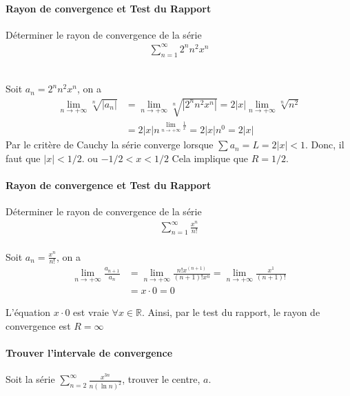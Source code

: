 \documentclass{report}
\begin{document}
\begin{multicols*}{2}
  \paragraph{Rayon de convergence et Test du Rapport}
      Déterminer le rayon de convergence de la série
      \begin{align*}
          \sum_{n=1}^{\infty }2^nn^2x^n
      \end{align*}
  
  \mbox{}\\ 
  Soit $a_n = 2^nn^2x^n$, on a 
  \begin{align*}
      \lim\limits_{n \to+\infty }\sqrt[n]{|a_n|}  &= 
      \lim\limits_{n \to+\infty }\sqrt[n]{|2^nn^2x^n|}  = 2|x|
      \lim\limits_{n \to+\infty }\sqrt[n]{n^2}  \\ 
                                      &= 
      2|x|n^{\lim\limits_{n \to+\infty } \frac{1}{x}} = 2|x|n^0 = 2|x|
  \end{align*}
  Par le critère de Cauchy la série converge lorsque 
  $\sum a_n = L = 2|x| < 1$. Donc, il faut que $|x| < 1/2$. 
  ou $ -1/2 < x < 1/2 $  
  Cela implique que $R = 1/2$. 


  \paragraph{Rayon de convergence et Test du Rapport}
      Déterminer le rayon de convergence de la série
      \begin{align*}
          \sum_{n=1}^{\infty }\frac{x^n}{n!} 
      \end{align*} 
  \mbox{}\\ 

  Soit $a_n = \frac{x^n}{n!} $, on a 
  \begin{align*}
    \lim\limits_{n \to+\infty }\frac{a_{n+1}}{a_n}   &= 
    \lim\limits_{n\to+\infty } \frac{n! x^{(n+1)}}{(n+1)!x^n}= 
    \lim\limits_{n\to+\infty } \frac{x^{1}}{(n+1)!} \\ 
                                          &= x \cdot 0 = 0
  \end{align*}

  L'équation $x \cdot 0$ est vraie $\forall x \in \mathbb{R}$. Ainsi, 
  par le test du rapport, le rayon de convergence est $R = \infty$


  \paragraph{Trouver l'intervale de convergence}
  Soit la série $\sum_{n=2}^{\infty }\frac{x^{3n}}{n(\ln n)^2}$, 
  trouver le centre, $a$. 


\end{multicols*}
\end{document}

